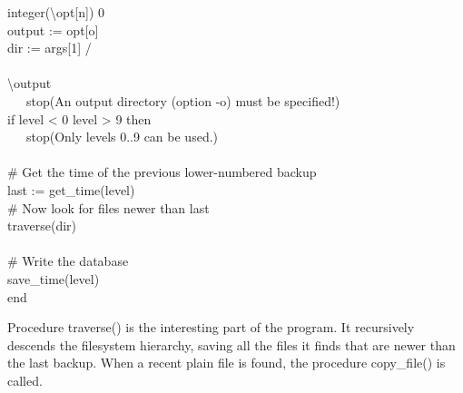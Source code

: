 {integer({\textbackslash}opt[{\textquotedbl}n{\textquotedbl}])
{\textbar} 0 \\
\>   output := opt[{\textquotedbl}o{\textquotedbl}] \\
\>   dir := args[1] {\textbar} {\textquotedbl}/{\textquotedbl} \\
\ \\
\>   {\textbackslash}output {\textbar} \\
\>   \ \ \ stop({\textquotedbl}An output directory (option -o) must be
specified!{\textquotedbl}) \\
\>   if level {\textless} 0 {\textbar} level {\textgreater} 9 then \\
\>   \ \ \ stop({\textquotedbl}Only levels 0..9 can be
used.{\textquotedbl}) \\
\ \\
\>   \# Get the time of the previous lower-numbered backup \\
\>   last := get\_time(level)
\ \\
\>   \# Now look for files newer than
{\textquotedbl}last{\textquotedbl} \\
\>   traverse(dir) \\
\ \\
\>   \# Write the database \\
\>   save\_time(level) \\
end
}

Procedure \textsf{traverse}\textsf{()} is the
interesting part of the program. It recursively descends the filesystem
hierarchy, saving all the files it finds that are newer than the last
backup. When a recent plain file is found, the procedure
\textsf{copy\_file()} is called. 

